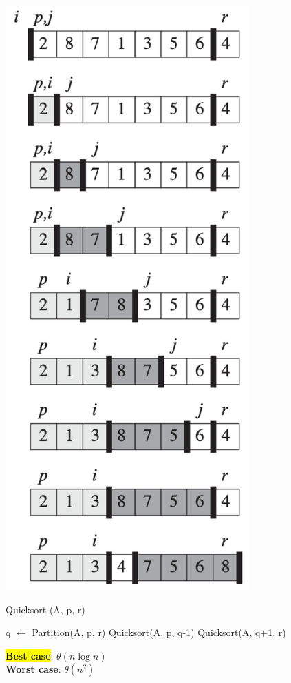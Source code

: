 \begin{minipage}[H]{0.28\textwidth}
    \centering
    \vspace{-1em}
    \includegraphics[width=0.7\textwidth]{assets/quicksort.png}
\end{minipage}

\begin{algorithm}[H]
    \caption{Quicksort (A, p, r)}
    \begin{algorithmic}[1]
            \State q $\gets$ Partition(A, p, r)
            \State Quicksort(A, p, q-1)
            \State Quicksort(A, q+1, r)
        \EndIf
    \end{algorithmic}
    \hl
    \textbf{Best case}: $\theta(n\log n)$ \\
    \textbf{Worst case}: $\theta(n^2)$
\end{algorithm}

